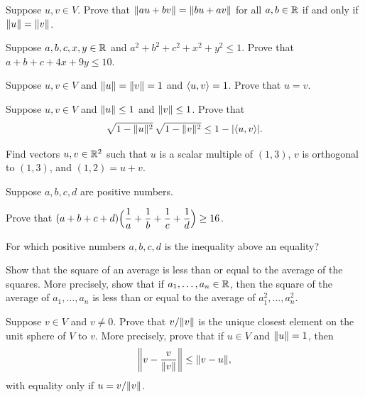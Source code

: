 \begin{exc}
\begin{exercise}
Suppose $u,v\in V$. Prove that $\lVert au+bv \rVert=\lVert bu+av \rVert$ for all $a,b\in\mathbb{R}$
if and only if $\lVert u \rVert=\lVert v \rVert$.
\end{exercise}

\begin{exercise}
Suppose $a,b,c,x,y\in\mathbb{R}$ and $a^2+b^2+c^2+x^2+y^2\le1$. Prove that
$a+b+c+4x+9y\le10$.
\end{exercise}

\begin{exercise}
Suppose $u,v\in V$ and $\lVert u \rVert=\lVert v \rVert=1$ and $\langle u, v \rangle=1$. Prove that
$u=v$.
\end{exercise}

\begin{exercise}
Suppose $u,v\in V$ and $\lVert u \rVert\le1$ and $\lVert v \rVert\le1$. Prove that
\[ \sqrt{1-\lVert u \rVert^2}\,\sqrt{1-\lVert v \rVert^2} \le 1-\lvert \langle u, v \rangle \rvert. \]
\end{exercise}

\begin{exercise}
Find vectors $u,v\in\mathbb{R}^2$ such that $u$ is a scalar multiple of $(1,3)$, $v$ is
orthogonal to $(1,3)$, and $(1,2)=u+v$.
\end{exercise}

\begin{exercise}
Suppose $a,b,c,d$ are positive numbers.
\begin{parts}
\item Prove that
  $(a+b+c+d)\Bigl(\dfrac1a+\dfrac1b+\dfrac1c+\dfrac1d\Bigr)\ge16$.
\item For which positive numbers $a,b,c,d$ is the inequality above an equality?
\end{parts}
\end{exercise}

\begin{exercise}
Show that the square of an average is less than or equal to the average of the
squares. More precisely, show that if $a_1,\dots,a_n\in\mathbb{R}$, then the square of
the average of $a_1,\dots,a_n$ is less than or equal to the average of
$a_1^2,\dots,a_n^2$.
\end{exercise}

\begin{exercise}
Suppose $v\in V$ and $v\ne0$. Prove that $v/\lVert v \rVert$ is the unique closest
element on the unit sphere of $V$ to $v$. More precisely, prove that if $u\in V$
and $\lVert u \rVert=1$, then
\[ \biggl\lVert v-\frac{v}{\lVert v \rVert}\biggr\rVert \le \lVert v-u \rVert, \]
with equality only if $u=v/\lVert v \rVert$.
\end{exercise}


\end{exc}
